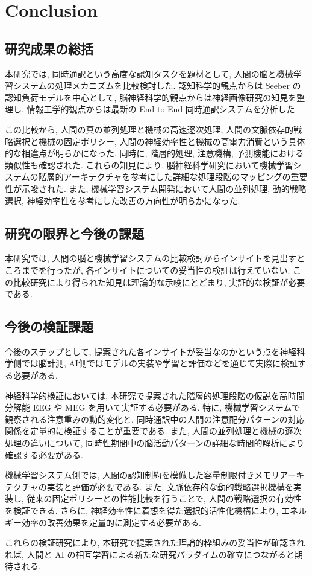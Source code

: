 \section{Conclusion}

\subsection{研究成果の総括}

本研究では, 同時通訳という高度な認知タスクを題材として, 人間の脳と機械学習システムの処理メカニズムを比較検討した.
認知科学的観点からは Seeber の認知負荷モデルを中心として, 脳神経科学的観点からは神経画像研究の知見を整理し, 情報工学的観点からは最新の End-to-End 同時通訳システムを分析した.

この比較から, 人間の真の並列処理と機械の高速逐次処理, 人間の文脈依存的戦略選択と機械の固定ポリシー, 人間の神経効率性と機械の高電力消費という具体的な相違点が明らかになった.
同時に, 階層的処理, 注意機構, 予測機能における類似性も確認された.
これらの知見により, 脳神経科学研究において機械学習システムの階層的アーキテクチャを参考にした詳細な処理段階のマッピングの重要性が示唆された.
また, 機械学習システム開発において人間の並列処理, 動的戦略選択, 神経効率性を参考にした改善の方向性が明らかになった.

\subsection{研究の限界と今後の課題}

本研究では, 人間の脳と機械学習システムの比較検討からインサイトを見出すところまでを行ったが, 各インサイトについての妥当性の検証は行えていない.
この比較研究により得られた知見は理論的な示唆にとどまり, 実証的な検証が必要である.

\subsection{今後の検証課題}

今後のステップとして, 提案された各インサイトが妥当なのかという点を神経科学側では脳計測, AI側ではモデルの実装や学習と評価などを通じて実際に検証する必要がある.

神経科学的検証においては, 本研究で提案された階層的処理段階の仮説を高時間分解能 EEG や MEG を用いて実証する必要がある.
特に, 機械学習システムで観察される注意重みの動的変化と, 同時通訳中の人間の注意配分パターンの対応関係を定量的に検証することが重要である.
また, 人間の並列処理と機械の逐次処理の違いについて, 同時性期間中の脳活動パターンの詳細な時間的解析により確認する必要がある.

機械学習システム側では, 人間の認知制約を模倣した容量制限付きメモリアーキテクチャの実装と評価が必要である.
また, 文脈依存的な動的戦略選択機構を実装し, 従来の固定ポリシーとの性能比較を行うことで, 人間の戦略選択の有効性を検証できる.
さらに, 神経効率性に着想を得た選択的活性化機構により, エネルギー効率の改善効果を定量的に測定する必要がある.

これらの検証研究により, 本研究で提案された理論的枠組みの妥当性が確認されれば, 人間と AI の相互学習による新たな研究パラダイムの確立につながると期待される.


